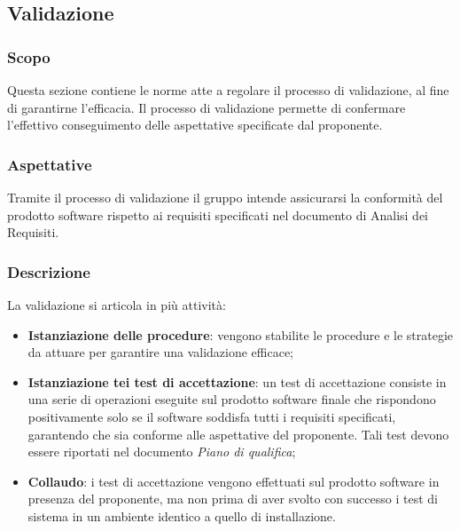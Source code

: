 \subsection{Validazione}
\label{sec:validazione}
\subsubsection{Scopo}
Questa sezione contiene le norme atte a regolare il processo di validazione, al fine di garantirne l'efficacia. Il processo di validazione permette di confermare l'effettivo conseguimento delle aspettative specificate dal proponente.
\subsubsection{Aspettative}
Tramite il processo di validazione il gruppo intende assicurarsi la conformità del prodotto software rispetto ai requisiti specificati nel documento di Analisi dei Requisiti.
\subsubsection{Descrizione}
La validazione si articola in più attività:
\begin{itemize}
    \item \textbf{Istanziazione delle procedure}: vengono stabilite le procedure e le strategie da attuare per garantire una validazione efficace;
    \item \textbf{Istanziazione tei test di accettazione}: un test di accettazione consiste in una serie di operazioni eseguite sul prodotto software finale che rispondono positivamente solo se il software soddisfa tutti i requisiti specificati, garantendo che sia conforme alle aspettative del proponente. Tali test devono essere riportati nel documento \emph{Piano di qualifica};
    \item \textbf{Collaudo}: i test di accettazione vengono effettuati sul prodotto software in presenza del proponente, ma non prima di aver svolto con successo i test di sistema in un ambiente identico a quello di installazione.
\end{itemize}
